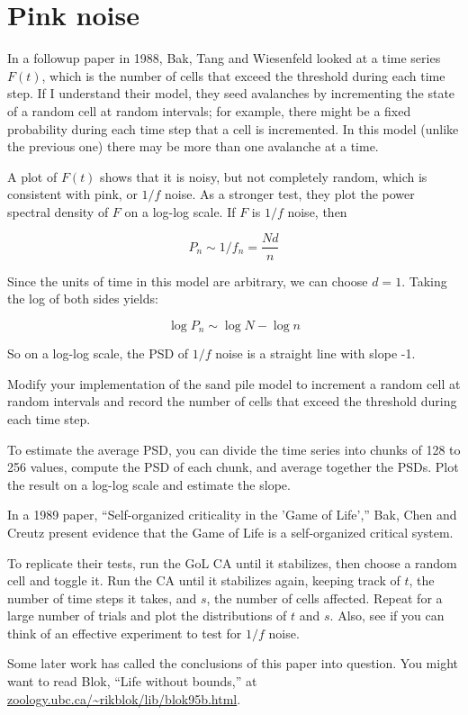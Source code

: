 \documentclass[10pt]{book}
\begin{document}
\section{Pink noise}

In a followup paper in 1988, Bak, Tang and Wiesenfeld looked
at a time series $F(t)$, which is the number of cells that
exceed the threshold during each time step.  If I understand
their model, they seed avalanches by incrementing the state
of a random cell at random intervals; for example, there might
be a fixed probability during each time step that a cell
is incremented.  In this model (unlike the previous one) there
may be more than one avalanche at a time.

A plot of $F(t)$ shows that it is noisy, but not completely
random, which is consistent with pink, or $1/f$ noise.
As a stronger test, they plot the power spectral density of
$F$ on a log-log scale.  If $F$ is $1/f$ noise, then

\[ P_n \sim 1 / f_n = \frac{N d}{n} \]

Since the units of time in this model are arbitrary, we
can choose $d=1$.  Taking the log of both sides yields:

\[ \log P_n \sim \log N - \log n \]

So on a log-log scale, the PSD of $1/f$ noise is a straight
line with slope -1.

\begin{exercise}

Modify your implementation of the sand pile model to increment
a random cell at random intervals and record the number of cells
that exceed the threshold during each time step.

To estimate the average PSD, you can divide the time series into
chunks of 128 to 256 values, compute the PSD of each chunk, and
average together the PSDs.  Plot the result on a log-log scale
and estimate the slope.

\end{exercise}


\begin{exercise}

In a 1989 paper, ``Self-organized criticality in the 'Game of Life',''
Bak, Chen and Creutz present evidence that the Game of Life
is a self-organized critical system.

To replicate their tests, run the GoL CA until it stabilizes,
then choose a random cell and toggle it.  Run the CA until
it stabilizes again, keeping track of $t$, the number
of time steps it takes, and $s$, the number of cells affected.
Repeat for a large number of trials and plot the distributions
of $t$ and $s$.  Also, see if you can think of an effective
experiment to test for $1/f$ noise.

Some later work has called the conclusions of this paper into
question.  You might want to read Blok, ``Life without bounds,''
at \url{zoology.ubc.ca/~rikblok/lib/blok95b.html}.

\end{exercise}
\end{document}
